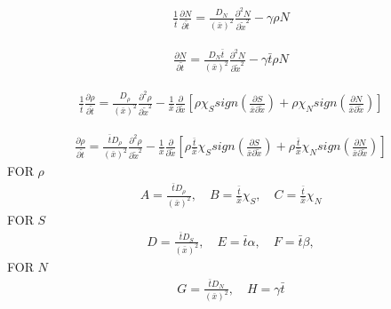 \documentclass[11pt,twoside]{article}
\numberwithin{equation}{section}
\theoremstyle{plain}
\theoremstyle{nonumberplain}
\begin{document}

\begin{eqnarray*}
	\frac{1}{\bar{t}}\frac{\partial N}{\partial\tilde{t}}=\frac{D_N}{(\bar{x})^2}\frac{\partial^2N}{\partial \tilde{x}^2}-\gamma\rho N
\end{eqnarray*}

\begin{eqnarray}
\frac{\partial N}{\partial\tilde{t}}=\frac{D_N \bar{t}}{(\bar{x})^2}\frac{\partial^2N}{\partial \tilde{x}^2}-\gamma\bar{t}\rho N
\end{eqnarray}




\begin{eqnarray*}
\frac{1}{\bar{t}}\frac{\partial \rho}{\partial\tilde{t}}=\frac{D_\rho}{(\bar{x})^2}\frac{\partial^2\rho}{\partial \tilde{x}^2}-\frac{1}{\bar{x}}\frac{\partial}{\partial \tilde{x}}\left[ \rho\chi_S sign\left( \frac{\partial S}{\bar{x}\partial \tilde{x}}\right) +\rho \chi_N sign\left( \frac{\partial N}{\bar{x}\partial \tilde{x}}\right)\right] 
\end{eqnarray*}

\begin{eqnarray}
\frac{\partial \rho}{\partial\tilde{t}}=\frac{\bar{t}D_\rho}{(\bar{x})^2}\frac{\partial^2\rho}{\partial \tilde{x}^2}-\frac{1}{\bar{x}}\frac{\partial}{\partial \tilde{x}}\left[ \rho\frac{\bar{t}}{\bar{x}}\chi_S sign\left( \frac{\partial S}{\bar{x}\partial \tilde{x}}\right) +\rho\frac{\bar{t}}{\bar{x}} \chi_N sign\left( \frac{\partial N}{\bar{x}\partial \tilde{x}}\right)\right] 
\end{eqnarray}
FOR $\rho$
\begin{eqnarray}
A=\frac{\bar{t}D_\rho}{(\bar{x})^2},\quad
B= \frac{\bar{t}}{\bar{x}}\chi_S,\quad
 C=\frac{\bar{t}}{\bar{x}} \chi_N
 \end{eqnarray}
 FOR $S$
 \begin{eqnarray}
 D=\frac{\bar{t}D_S}{(\bar{x})^2},\quad
 E=\bar{t}\alpha,\quad
  F=\bar{t}\beta,
\end{eqnarray}
FOR $N$
\begin{eqnarray}
 G=\frac{\bar{t}D_N}{(\bar{x})^2},\quad
 H=\gamma \bar{t}
\end{eqnarray}
\end{document}
